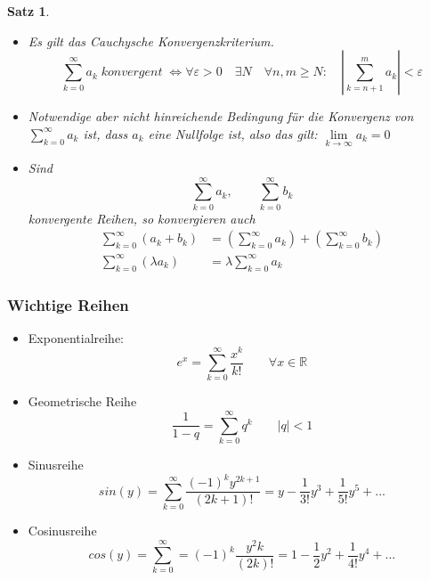 \documentclass[12pt,a4paper]{report}%
\newtheorem{satz}{Satz}[section]
\numberwithin{equation}{section}
\newcommand{\R}{\mathbb{R}} %
\numberwithin{equation}{subsection}
\begin{document}
  \begin{satz} $\;$\newline \vspace{-0.5cm}
  \begin{itemize}
  \item[a) ] Es gilt das Cauchysche Konvergenzkriterium.
    \begin{equation}
      \sum\limits_{k=0}^{\infty} a_k \; konvergent \; \Leftrightarrow \forall \varepsilon > 0 \quad \exists N \quad \forall n,m \geq N: \quad \left| \sum\limits_{k = n+1}^m a_k \right| < \varepsilon
    \end{equation}
    \item[b) ] Notwendige aber nicht hinreichende Bedingung für die Konvergenz von $\sum\limits_{k=0}^{\infty} a_k$ ist, dass $a_k$ eine Nullfolge ist, also das gilt: $\lim\limits_{k \rightarrow \infty} a_k = 0$
    \item[c) ] Sind 
    \begin{equation*}
      \sum\limits_{k=0}^{\infty} a_k, \qquad \sum\limits_{k=0}^{\infty} b_k
    \end{equation*}
    konvergente Reihen, so konvergieren auch
    \begin{align*}
    \sum\limits_{k=0}^{\infty} \left( a_k + b_k\right) &= \left(\sum\limits_{k=0}^{\infty} a_k\right) + \left(\sum\limits_{k=0}^{\infty} b_k\right) \\
    \sum\limits_{k=0}^{\infty} \left( \lambda a_k\right) &= \lambda \sum\limits_{k=0}^{\infty} a_k
    \end{align*}
  \end{itemize}
  \end{satz}
  
	  \subsubsection{Wichtige Reihen}
	  \begin{itemize}
	    \item Exponentialreihe:
	    \begin{equation}
	      e^x = \sum\limits_{k=0}^\infty \frac{x^k}{k!} \qquad \forall x \in \R
	    \end{equation}
	    \item Geometrische Reihe
	    \begin{equation}
	      \frac{1}{1-q} = \sum\limits_{k = 0}^\infty q^k \qquad |q| < 1
	    \end{equation}
	    \item Sinusreihe
	    \begin{equation}
	      sin(y) = \sum\limits_{k = 0}^\infty \frac{(-1)^k y^{2k+1}}{(2k+1)!} = y -\frac{1}{3!}y^3 + \frac{1}{5!}y^5 + ...
	    \end{equation}
	    \item Cosinusreihe
	    \begin{equation}
	      cos(y) = \sum\limits_{k = 0}^\infty = (-1)^k \frac{y^2k}{(2k)!} = 1 - \frac{1}{2}y^2 + \frac{1}{4!}y^4 + ...
	    \end{equation}
	  \end{itemize}
	  
\end{document}
